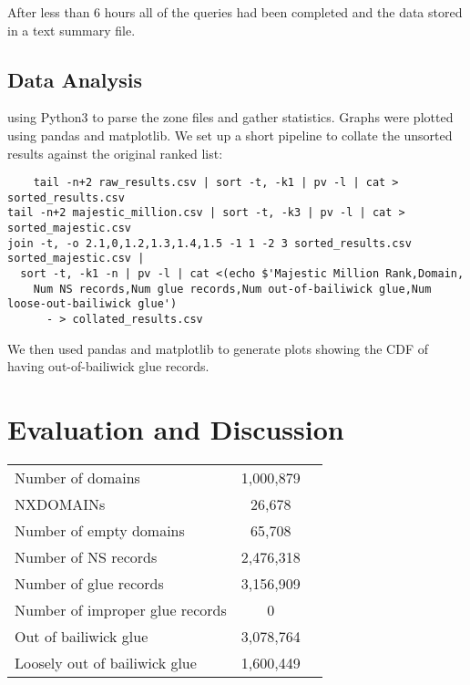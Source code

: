 \documentclass{idc_msc}
\begin{document}
After less than 6 hours all of the queries had been completed and the data stored in a text summary file.

\subsection{Data Analysis}

using Python3 to parse the zone files and gather statistics. Graphs were plotted using pandas and matplotlib.
We set up a short pipeline to collate the unsorted results against the original ranked list:
\begin{verbatim}
	tail -n+2 raw_results.csv | sort -t, -k1 | pv -l | cat > sorted_results.csv
tail -n+2 majestic_million.csv | sort -t, -k3 | pv -l | cat > sorted_majestic.csv
join -t, -o 2.1,0,1.2,1.3,1.4,1.5 -1 1 -2 3 sorted_results.csv sorted_majestic.csv | 
  sort -t, -k1 -n | pv -l | cat <(echo $'Majestic Million Rank,Domain,
    Num NS records,Num glue records,Num out-of-bailiwick glue,Num loose-out-bailiwick glue') 
      - > collated_results.csv
\end{verbatim}
We then used pandas and matplotlib to generate plots showing the CDF of having out-of-bailiwick glue records.





\section{Evaluation and Discussion}

\begin{table}
\begin{tabular}{l|cc}
 & & \\
 \hline
 Number of domains & 1,000,879 & \\
 NXDOMAINs & 26,678 & \\
 Number of empty domains & 65,708 & \\
 Number of NS records & 2,476,318 & \\
 Number of glue records & 3,156,909 & \\
 Number of improper glue records & 0 & \\
 Out of bailiwick glue & 3,078,764 & \\
 Loosely out of bailiwick glue & 1,600,449 & \\
\end{tabular}
\end{table}
\end{document}
